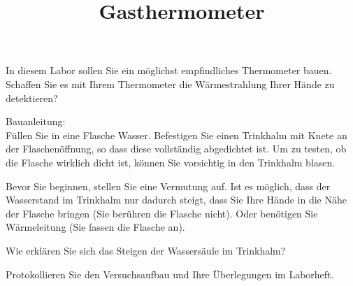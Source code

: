 \documentclass[12pt,a5paper, twosite]{article}
\author{}
\date{}
\title{Gasthermometer}
\begin{document}
\maketitle

In diesem Labor sollen Sie ein möglichst empfindliches Thermometer bauen.
Schaffen Sie es mit Ihrem Thermometer die Wärmestrahlung Ihrer Hände zu detektieren?

Bauanleitung:\\
Füllen Sie in eine Flasche Wasser. 
Befestigen Sie einen Trinkhalm mit Knete an der Flaschenöffnung, so dass diese vollständig abgedichtet ist.
Um zu testen, ob die Flasche wirklich dicht ist, können Sie vorsichtig in den Trinkhalm blasen.


Bevor Sie beginnen, stellen Sie eine Vermutung auf. 
Ist es möglich, dass der Wasserstand im Trinkhalm nur dadurch steigt, dass Sie Ihre Hände in die Nähe der Flasche bringen (Sie berühren die Flasche nicht).
Oder benötigen Sie Wärmeleitung (Sie fassen die Flasche an).

Wie erklären Sie sich das Steigen der Wassersäule im Trinkhalm?

Protokollieren Sie den Versuchsaufbau und Ihre Überlegungen im Laborheft.
\end{document}
